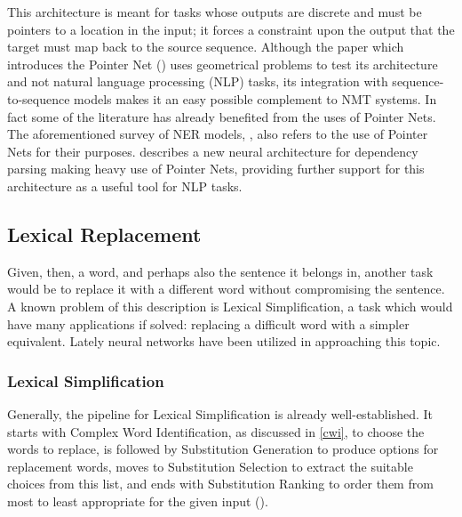 This architecture is meant for tasks whose outputs are discrete and must be pointers to a location in the input; it forces a constraint upon the output that the target must map back to the source sequence. Although the paper which introduces the Pointer Net (\cite{vinyals2015pointer}) uses geometrical problems to test its architecture and not natural language processing (NLP) tasks, its integration with sequence-to-sequence models makes it an easy possible complement to NMT systems. In fact some of the literature has already benefited from the uses of Pointer Nets. The aforementioned survey of NER models, \cite{li2018ner}, also refers to the use of Pointer Nets for their purposes. \cite{ma2018stack} describes a new neural architecture for dependency parsing making heavy use of Pointer Nets, providing further support for this architecture as a useful tool for NLP tasks.

\subsection{Lexical Replacement}

Given, then, a word, and perhaps also the sentence it belongs in, another task would be to replace it with a different word without compromising the sentence. A known problem of this description is Lexical Simplification, a task which would have many applications if solved: replacing a difficult word with a simpler equivalent. Lately neural networks have been utilized in approaching this topic.

\subsubsection{Lexical Simplification}

Generally, the pipeline for Lexical Simplification is already well-established. It starts with Complex Word Identification, as discussed in \ref{cwi}, to choose the words to replace, is followed by Substitution Generation to produce options for replacement words, moves to Substitution Selection to extract the suitable choices from this list, and ends with Substitution Ranking to order them from most to least appropriate for the given input (\cite{paetzold2017lexical}).

